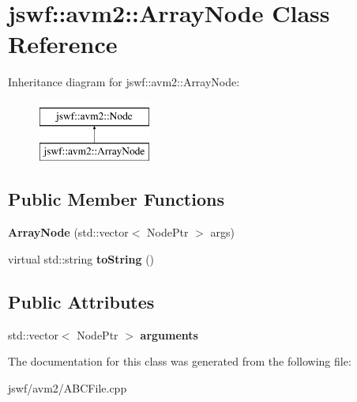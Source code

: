 \hypertarget{classjswf_1_1avm2_1_1_array_node}{\section{jswf\+:\+:avm2\+:\+:Array\+Node Class Reference}
\label{classjswf_1_1avm2_1_1_array_node}
}
Inheritance diagram for jswf\+:\+:avm2\+:\+:Array\+Node\+:\begin{figure}[H]
\begin{center}
\leavevmode
\includegraphics[height=2.000000cm]{classjswf_1_1avm2_1_1_array_node}
\end{center}
\end{figure}
\subsection*{Public Member Functions}
\begin{DoxyCompactItemize}
\item 
\hypertarget{classjswf_1_1avm2_1_1_array_node_accc585e56d81c48e3b4c05c8e99193c7}{{\bfseries Array\+Node} (std\+::vector$<$ Node\+Ptr $>$ args)}\label{classjswf_1_1avm2_1_1_array_node_accc585e56d81c48e3b4c05c8e99193c7}

\item 
\hypertarget{classjswf_1_1avm2_1_1_array_node_a310402dde096c565f10fee6aa95eb9a6}{virtual std\+::string {\bfseries to\+String} ()}\label{classjswf_1_1avm2_1_1_array_node_a310402dde096c565f10fee6aa95eb9a6}

\end{DoxyCompactItemize}
\subsection*{Public Attributes}
\begin{DoxyCompactItemize}
\item 
\hypertarget{classjswf_1_1avm2_1_1_array_node_a63e43c7769397f624a01fc80c1160797}{std\+::vector$<$ Node\+Ptr $>$ {\bfseries arguments}}\label{classjswf_1_1avm2_1_1_array_node_a63e43c7769397f624a01fc80c1160797}

\end{DoxyCompactItemize}


The documentation for this class was generated from the following file\+:\begin{DoxyCompactItemize}
\item 
jswf/avm2/A\+B\+C\+File.\+cpp\end{DoxyCompactItemize}

